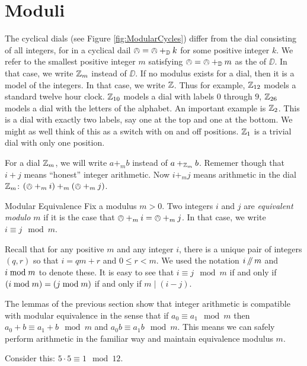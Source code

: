 \section*{Moduli}

The cyclical dials (see Figure \ref{fig:ModularCycles}) differ from the dial consisting of all integers, for in a cyclical dail $\owedge = \owedge +_{\mathbb D} k$ for some positive integer $k$. We refer to the smallest positive integer $m$ satisfying $\owedge = \owedge +_{\mathbb D} m$ as the  of $\DD$. In that case, we write ${\mathbb Z}_m$ instead of $\DD$. If no modulus exists for a dial, then it is a model of the integers. In that case, we write ${\mathbb Z}$. 
Thus for example, ${\mathbb Z}_{12}$ models a standard twelve hour clock. ${\mathbb Z}_{10}$ models a dial with labels $0$ through $9$, ${\mathbb Z}_{26}$ models a dial with the letters of the alphabet. An important example is ${\mathbb Z}_2$. This is a dial with exactly two labels, say one at the top and one at the bottom. We might as well think of this as a switch with on and off positions. ${\mathbb Z}_1$ is a trivial dial with only one position.

For a dial ${\mathbb Z}_m$, we will write $a +_m b$ instead of $a +_{{\mathbb Z}_m} b$. Rememer though that $i+j$ means ``honest'' integer arithmetic. Now $i +_m j$ means arithmetic in the dial ${\mathbb Z}_m$: $(\owedge +_m i)+_m(\owedge +_m j)$. 

\begin{defn}{Modular Equivalence}\label{def:modulus}
	Fix a modulus $m>0$. Two integers $i$ and $j$ are \emph{equivalent modulo $m$} if it is the case that $\owedge +_m i = \owedge +_m j$. In that case, we write $i\equiv j\mod m$. 
\end{defn}

Recall that for any positive $m$ and any integer $i$, there is a unique pair of integers $(q,r)$ so that $i = qm + r$ and $0\leq r < m$. We used the notation $i\mathop{/\mkern-5mu/} m$ and $i\bmod m$ to denote these. It is easy to see that
$i \equiv j \mod m$ if and only if $(i\bmod m)=(j\bmod m)$ if and only if $m\mid (i-j)$.

The lemmas of the previous section show that integer arithmetic is compatible with modular equivalence in the sense that if $a_0\equiv a_1\mod m$ then $a_0 + b \equiv a_1 + b\mod m$ and $a_0b\equiv a_1b\mod m$. This means we can safely perform arithmetic in the familiar way and maintain equivalence modulus $m$. 

Consider this: $5\cdot 5 \equiv 1\mod {12}$. 




